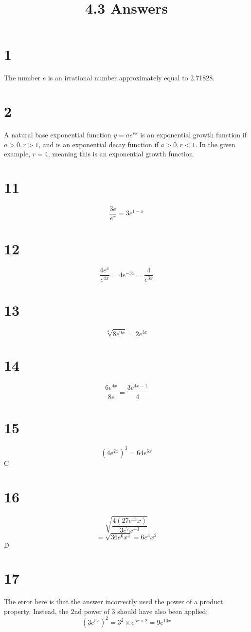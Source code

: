 \documentclass{article}
\title{4.3 Answers}
\theoremstyle{definition}
\newcommand{\?}{\stackrel{?}{=}}
\begin{document}
\maketitle

\section*{1}
The number $e$ is an irrational number approximately equal to 2.71828.

\section*{2}
A natural base exponential function $y=ae^{rx}$ is an exponential growth function if $a>0,r>1$, and is an exponential decay function if 
$a>0,r<1$. In the given example, $r=4$, meaning this is an exponential growth function.

\section*{11}
\[ \frac{3e}{e^x}=3e^{1-x} \]

\section*{12}
\[ \frac{4e^x}{e^{4x}}=4e^{-3x}=\frac{4}{e^{3x}} \]

\section*{13}
\[ \sqrt[3]{8e^{9x}}=2e^{3x} \]

\section*{14}
\[ \frac{6e^{4x}}{8e}=\frac{3e^{4x-1}}{4} \]

\section*{15}
\[ (4e^{2x})^3=64e^{6x} \] C

\section*{16}
\[ \sqrt{\frac{4(27e^{13}x)}{3e^7x^{-3}}} \] \[ =\sqrt{36e^6x^4}=6e^3x^2\]
D

\section*{17}
The error here is that the answer incorrectly used the power of a product property. Instead, the $2$nd power of $3$ should have also been applied:
\[ (3e^{5x})^2=3^2\times e^{5x\times 2}=9e^{10x} \]
\end{document}
